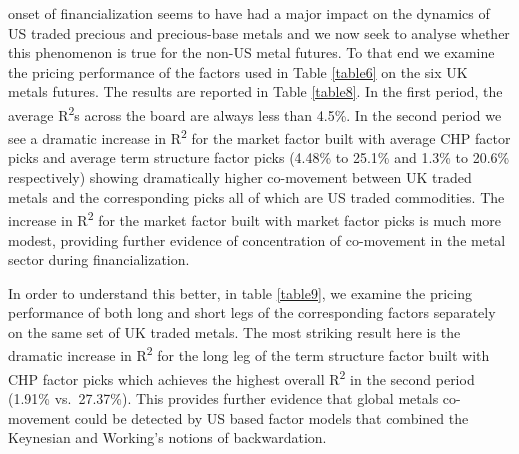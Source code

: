 \documentclass[]{elsarticle} %
\begin{document}
onset of financialization seems to have had a major impact on the
dynamics of US traded precious and precious-base metals and we now seek
to analyse whether this phenomenon is true for the non-US metal futures.
To that end we examine the pricing performance of the factors used in
Table \ref{table6} on the six UK metals futures. The results are
reported in Table \ref{table8}. In the first period, the average
R\textsuperscript{2}s across the board are always less than 4.5\%. In
the second period we see a dramatic increase in R\textsuperscript{2} for
the market factor built with average CHP factor picks and average term
structure factor picks (4.48\% to 25.1\% and 1.3\% to 20.6\%
respectively) showing dramatically higher co-movement between UK traded
metals and the corresponding picks all of which are US traded
commodities. The increase in R\textsuperscript{2} for the market factor
built with market factor picks is much more modest, providing further
evidence of concentration of co-movement in the metal sector during
financialization.

In order to understand this better, in table \ref{table9}, we examine
the pricing performance of both long and short legs of the corresponding
factors separately on the same set of UK traded metals. The most
striking result here is the dramatic increase in R\textsuperscript{2}
for the long leg of the term structure factor built with CHP factor
picks which achieves the highest overall R\textsuperscript{2} in the
second period (1.91\% vs.~27.37\%). This provides further evidence that
global metals co-movement could be detected by US based factor models
that combined the Keynesian and Working's notions of backwardation.
\end{document}
